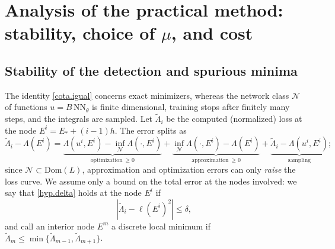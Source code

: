 \documentclass[10pt]{amsart}
\newenvironment{revblock}{\color{blue}}{}
\theoremstyle{definition}
\theoremstyle{remark}
\theoremstyle{plain}
\begin{document}
\section{Analysis of the practical method: stability, choice of \texorpdfstring{$\mu$}{mu}, and cost}\label{sec.analysis}

\subsection{Stability of the detection and spurious minima}\label{sec.stability}
\begin{revblock}
The identity \eqref{cota.igual} concerns exact minimizers, whereas the network class $\mathcal N$ of
functions $u=B\,\mathrm{NN}_\theta$ is finite dimensional, training stops after finitely many steps,
and the integrals are sampled. Let $\tilde\Lambda_i$ be the computed (normalized) loss at the node
$E^i=E_*+(i-1)h$. The error splits as
\[
\tilde\Lambda_i-\Lambda(E^i)=
\underbrace{\Lambda(u^i,E^i)-\inf_{\mathcal N}\Lambda(\cdot,E^i)}_{\text{optimization}\ \ge0}
+\underbrace{\inf_{\mathcal N}\Lambda(\cdot,E^i)-\Lambda(E^i)}_{\text{approximation}\ \ge0}
+\underbrace{\tilde\Lambda_i-\Lambda(u^i,E^i)}_{\text{sampling}} ;
\]
since $\mathcal N\subset \mathrm{Dom}(L)$, approximation and optimization errors can only \emph{raise} the loss
curve. We assume only a bound on the total error at the nodes involved: we say that
\eqref{hyp.delta} holds at the node $E^i$ if
\begin{equation}\label{hyp.delta}
|\tilde\Lambda_i-\ell(E^i)^2|\le\delta ,
\end{equation}
and call an interior node $E^m$ a discrete local minimum if
$\tilde\Lambda_m\le\min\{\tilde\Lambda_{m-1},\tilde\Lambda_{m+1}\}$.


\end{revblock}
\end{document}
